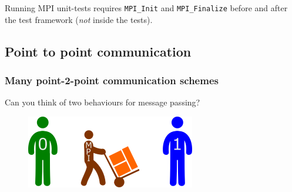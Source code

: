 Running MPI unit-tests requires \texttt{MPI\_Init} and
\texttt{MPI\_Finalize} before and after the test framework (\emph{not}
inside the tests).

\begin{Shaded}
\begin{Highlighting}[]


\NormalTok{) \{}
     
    \NormalTok{);}
\NormalTok{\}}

   
     
     
\NormalTok{\}}
\end{Highlighting}
\end{Shaded}

\subsection{Point to point
communication}\label{point-to-point-communication}

\subsubsection{Many point-2-point communication
schemes}\label{many-point-2-point-communication-schemes}

Can you think of two behaviours for message passing?

\begin{figure}[htbp]
\centering
\includegraphics{06MPI/figures/mpi.png}
\end{figure}

